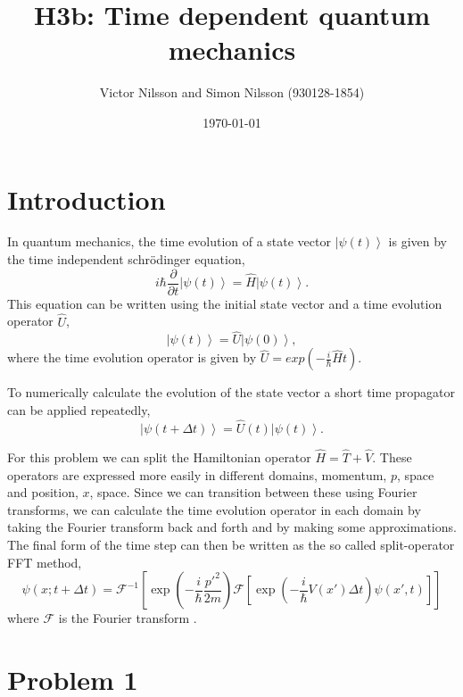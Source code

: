 



\title{H3b: Time dependent quantum mechanics}
\author{Victor Nilsson and Simon Nilsson (930128-1854)}
\date{\today}





\section*{Introduction}

In quantum mechanics, the time evolution of a state vector $\left|\psi(t)\right>$ is given by the time independent schr\"odinger equation,
\begin{equation}
i\hbar\frac{\partial}{\partial t}\left|\psi(t)\right> = \hat{H}\left|\psi(t)\right>.
\end{equation}
This equation can be written using the initial state vector and a time evolution operator $\hat{U}$,
\begin{equation}
\left|\psi(t)\right> = \hat{U}\left|\psi(0)\right>,
\end{equation}
where the time evolution operator is given by $\hat{U}=exp\left(-\frac{i}{\hbar}\hat{H}t\right)$.

To numerically calculate the evolution of the state vector a short time propagator can be applied repeatedly,
\begin{equation}
\left|\psi(t+\Delta t)\right> = \hat{U}(t)\left|\psi(t)\right>.
\end{equation}

For this problem we can split the Hamiltonian operator $\hat{H}=\hat{T}+\hat{V}$. These operators are expressed more easily in different domains, momentum, $p$, space and position, $x$, space. Since we can transition between these using Fourier transforms, we can calculate the time evolution operator in each domain by taking the Fourier transform back and forth and by making some approximations. The final form of the time step can then be written as the so called split-operator FFT method,
\begin{equation}
\psi(x;t+\Delta t)= \mathcal{F}^{-1}\left[\exp\left(-\frac{i}{\hbar}\frac{p'^{2}}{2m}\right)\mathcal{F}\left[\exp\left(-\frac{i}{\hbar}V(x')\Delta t\right)\psi(x',t)\right]\right]
\end{equation}
where $\mathcal{F}$ is the Fourier transform \cite{probdesc}. 

\section*{Problem 1}

